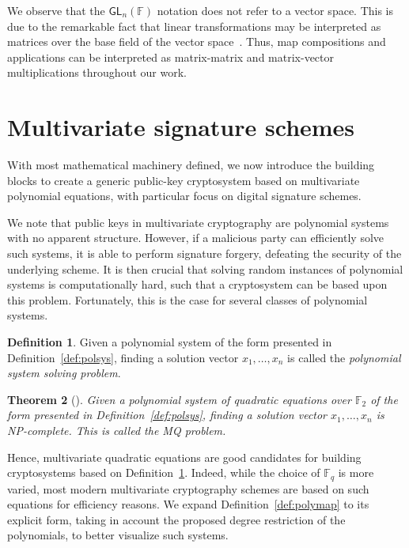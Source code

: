 \documentclass[draft, 12pt, a4paper, oneside]{memoir}
\newtheorem{theorem}{Theorem}[section]
\theoremstyle{definition}
\newtheorem{definition}[theorem]{Definition}
\begin{document}
We observe that the $\mathsf{GL}_{n}(\mathbb{F})$ notation does not refer to a vector space. This is due to the remarkable fact that linear transformations may be interpreted as matrices over the base field of the vector space~\cite[Section 11.2]{Dummit:2003}. Thus, map compositions and applications can be interpreted as matrix-matrix and matrix-vector multiplications throughout our work.

\section{Multivariate signature schemes}\label{sec:mult}

With most mathematical machinery defined, we now introduce the building blocks to create a generic public-key cryptosystem based on multivariate polynomial equations, with particular focus on digital signature schemes. 

We note that public keys in multivariate cryptography are polynomial systems with no apparent structure. However, if a malicious party can efficiently solve such systems, it is able to perform signature forgery, defeating the security of the underlying scheme. It is then crucial that solving random instances of polynomial systems is computationally hard, such that a cryptosystem can be based upon this problem. Fortunately, this is the case for several classes of polynomial systems.

\begin{definition}\label{def:posso}
  Given a polynomial system of the form presented in Definition~\ref{def:polsys}, finding a solution vector $x_{1}, \dots, x_{n}$ is called the \emph{polynomial system solving problem}.
\end{definition}

\begin{theorem}[{\cite[Appendix A]{Patarin:199711}}]
  Given a polynomial system of \emph{quadratic equations over $\mathbb{F}_{2}$} of the form presented in Definition~\ref{def:polsys}, finding a solution vector $x_{1}, \dots, x_{n}$ is NP-complete. This is called the \emph{MQ problem}.
\end{theorem}

Hence, multivariate quadratic equations are good candidates for building cryptosystems based on Definition~\ref{def:posso}. Indeed, while the choice of $\mathbb{F}_{q}$ is more varied, most modern multivariate cryptography schemes are based on such equations for efficiency reasons. We expand Definition~\ref{def:polymap} to its explicit form, taking in account the proposed degree restriction of the polynomials, to better visualize such systems.
\end{document}
